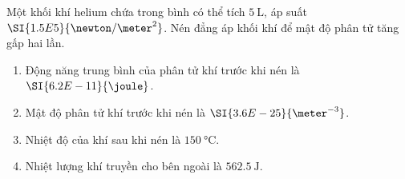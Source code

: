 \begin{ex}
	Một khối khí helium chứa trong bình có thể tích $\SI{5}{\liter}$, áp suất $\SI{1.5E5}{\newton/\meter^2}$. Nén đẳng áp khối khí để mật độ phân tử tăng gấp hai lần.
	\begin{enumerate}[label=\alph*)]
		\item Động năng trung bình của phân tử khí trước khi nén là $\SI{6.2E-11}{\joule}$.
		\item Mật độ phân tử khí trước khi nén là $\SI{3.6E-25}{\meter^{-3}}$.
		\item Nhiệt độ của khí sau khi nén là $\SI{150}{\celsius}$.
		\item Nhiệt lượng khí truyền cho bên ngoài là $\SI{562.5}{\joule}$.
	\end{enumerate}
	
\end{ex}
